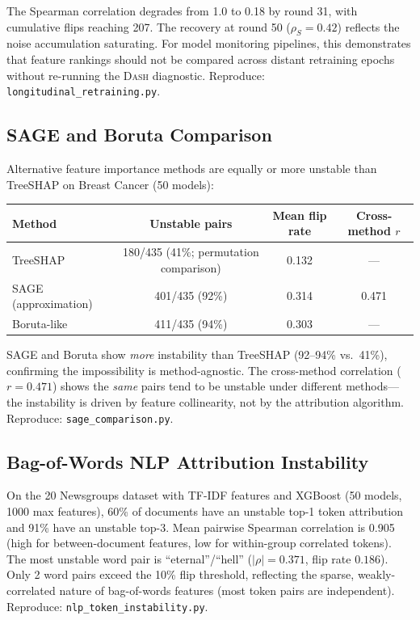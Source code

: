 \documentclass{article}
\newcommand{\DASH}{\textsc{Dash}}
\begin{document}
The Spearman correlation degrades from 1.0 to 0.18 by round 31, with cumulative flips reaching 207. The recovery at round 50 ($\rho_S{=}0.42$) reflects the noise accumulation saturating. For model monitoring pipelines, this demonstrates that feature rankings should not be compared across distant retraining epochs without re-running the \DASH{} diagnostic.
Reproduce: \texttt{longitudinal\_retraining.py}.

\subsection{SAGE and Boruta Comparison}
\label{sec:sage-comparison}

Alternative feature importance methods are equally or more unstable than TreeSHAP on Breast Cancer (50 models):

\begin{center}
\small
\begin{tabular}{@{}lccc@{}}
\toprule
Method & Unstable pairs & Mean flip rate & Cross-method $r$ \\
\midrule
TreeSHAP             & 180/435 (41\%; permutation comparison) & 0.132 & --- \\
SAGE (approximation) & 401/435 (92\%) & 0.314 & 0.471 \\
Boruta-like          & 411/435 (94\%) & 0.303 & --- \\
\bottomrule
\end{tabular}
\end{center}

SAGE and Boruta show \emph{more} instability than TreeSHAP (92--94\% vs.\ 41\%), confirming the impossibility is method-agnostic. The cross-method correlation ($r{=}0.471$) shows the \emph{same} pairs tend to be unstable under different methods---the instability is driven by feature collinearity, not by the attribution algorithm.
Reproduce: \texttt{sage\_comparison.py}.

\subsection{Bag-of-Words NLP Attribution Instability}
\label{sec:nlp-instability}

On the 20 Newsgroups dataset with TF-IDF features and XGBoost (50 models, 1000 max features), 60\% of documents have an unstable top-1 token attribution and 91\% have an unstable top-3. Mean pairwise Spearman correlation is 0.905 (high for between-document features, low for within-group correlated tokens). The most unstable word pair is ``eternal''/``hell'' ($|\rho|{=}0.371$, flip rate $0.186$). Only 2 word pairs exceed the 10\% flip threshold, reflecting the sparse, weakly-correlated nature of bag-of-words features (most token pairs are independent).
Reproduce: \texttt{nlp\_token\_instability.py}.
\end{document}
